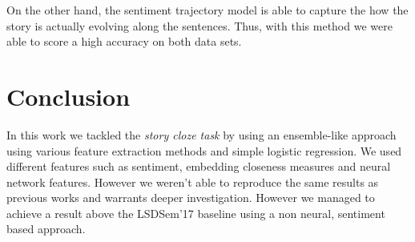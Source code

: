 \documentclass{article}
\begin{document}
On the other hand, the sentiment trajectory model is able to capture the how the
story is actually evolving along the sentences. Thus, with this method we were
able to score a high accuracy on both data sets.


\section{Conclusion}
In this work we tackled the \textit{story cloze task} by using an ensemble-like
approach using various feature extraction methods and simple logistic regression.
We used different features such as sentiment, embedding closeness measures and
neural network features. However we weren't able to reproduce the same results 
as previous works and warrants deeper investigation. However we managed to achieve
a result above the LSDSem'17 baseline using a non neural, sentiment based approach.



\end{document}
